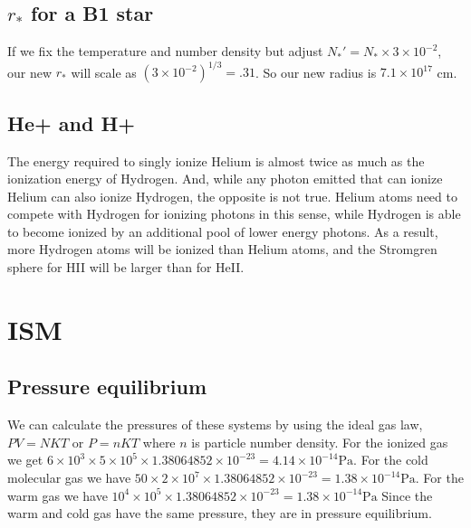 \documentclass[12pt]{article}
\begin{document}
\subsection{$r_*$ for a B1 star}
If we fix the temperature and number density but adjust $N_*' = N_* \times 3 \times 10^{-2}$, our new $r_*$ will scale as $(3 \times 10^{-2})^{1/3} =.31$. So our new radius is $7.1 \times 10^{17}$ cm.

\subsection{He+ and H+}
The energy required to singly ionize Helium is almost twice as much as the ionization energy of Hydrogen. And, while any photon emitted that can ionize Helium can also ionize Hydrogen, the opposite is not true. Helium atoms need to compete with Hydrogen for ionizing photons in this sense, while Hydrogen is able to become ionized by an additional pool of lower energy photons. As a result, more Hydrogen atoms will be ionized than Helium atoms, and the Stromgren sphere for HII will be larger than for HeII. 

\section{ISM}
\subsection{Pressure equilibrium}
We can calculate the pressures of these systems by using the ideal gas law, $PV = NKT$ or $P = nKT$ where $n$ is particle number density. For the ionized gas we get $6\times10^{3}  \times 5\times10^{5} \times 1.38064852 \times 10^{-23} = 4.14 \times 10^{-14} \mathrm{Pa}$.
For the cold molecular gas we have  $50 \times 2\times 10^{7} \times 1.38064852 \times 10^{-23} = 1.38 \times 10^{-14} \mathrm{Pa}$.
For the warm gas we have $ 10^4 \times 10^5   \times 1.38064852 \times 10^{-23} = 1.38 \times 10^{-14}\mathrm{Pa}$
Since the warm and cold gas have the same pressure, they are in pressure equilibrium.
\end{document}
